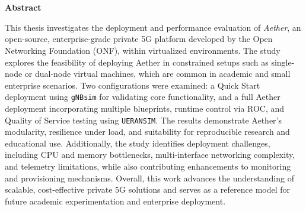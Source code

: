 \chapter*{}
\begin{center}
  \Large\textbf{Abstract}
\end{center}

\noindent
This thesis investigates the deployment and performance evaluation of \textit{Aether}, an open-source, enterprise-grade private 5G platform developed by the Open Networking Foundation (ONF), within virtualized environments. The study explores the feasibility of deploying Aether in constrained setups such as single-node or dual-node virtual machines, which are common in academic and small enterprise scenarios. Two configurations were examined: a Quick Start deployment using \texttt{gNBsim} for validating core functionality, and a full Aether deployment incorporating multiple blueprints, runtime control via ROC, and Quality of Service testing using \texttt{UERANSIM}. The results demonstrate Aether’s modularity, resilience under load, and suitability for reproducible research and educational use. Additionally, the study identifies deployment challenges, including CPU and memory bottlenecks, multi-interface networking complexity, and telemetry limitations, while also contributing enhancements to monitoring and provisioning mechanisms. Overall, this work advances the understanding of scalable, cost-effective private 5G solutions and serves as a reference model for future academic experimentation and enterprise deployment.

